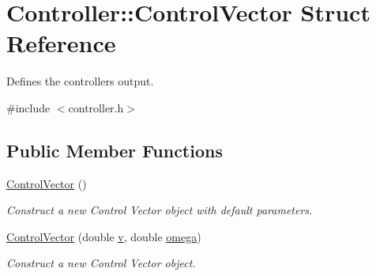 \hypertarget{structController_1_1ControlVector}{}\section{Controller\+:\+:Control\+Vector Struct Reference}
\label{structController_1_1ControlVector}


Defines the controllers output.  




{\ttfamily \#include $<$controller.\+h$>$}

\subsection*{Public Member Functions}
\begin{DoxyCompactItemize}
\item 
\mbox{\label{structController_1_1ControlVector_abf98db4ce95ac636bb5ac950b6b820b3}} 
\hyperlink{structController_1_1ControlVector_abf98db4ce95ac636bb5ac950b6b820b3}{Control\+Vector} ()
\begin{DoxyCompactList}\small\item\em Construct a new Control Vector object with default parameters. \end{DoxyCompactList}\item 
\hyperlink{structController_1_1ControlVector_a547dd5c56a7be54acb7c44f7fdf52c57}{Control\+Vector} (double \hyperlink{structController_1_1ControlVector_af8d8ff93ddf343a13a35bba355d39976}{v}, double \hyperlink{structController_1_1ControlVector_ad5963169c4ea0c021cb923191aef7ed3}{omega})
\begin{DoxyCompactList}\small\item\em Construct a new Control Vector object. \end{DoxyCompactList}\end{DoxyCompactItemize}
